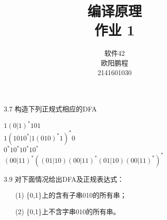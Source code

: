 \documentclass[]{ctexart}
\title{编译原理 \\ 作业 1}
\author{软件42 \\ 欧阳鹏程 \\ 2141601030}
\begin{document}
\maketitle

\begin{enumerate}
	\item[3.7] 构造下列正规式相应的DFA
	\begin{center}
		$1(0|1)^{*}101$ \\
		$1(1010^{*}|1(010)^{*}1)^{*}0$ \\
		$0^{*}10^{*}10^{*}10^{*}$ \\
		$(00|11)^{*}((01|10)(00|11)^{*}(01|10)(00|11)^{*})^{*}$
	\end{center}
	
	
	\item[3.9] 对下面情况给出DFA及正规表达式：
	\begin{enumerate}
		\item[(1)] \{0,1\}上的含有子串010的所有串；
		\item[(2)] \{0,1\}上不含字串010的所有串。
	\end{enumerate}


\end{enumerate}
\end{document}
